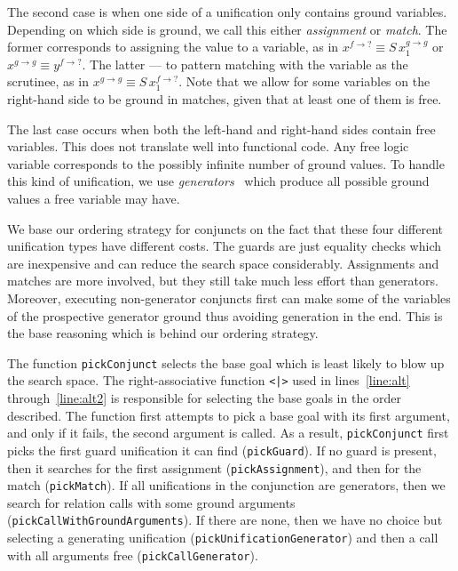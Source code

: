 The second case is when one side of a unification only contains ground variables.
Depending on which side is ground, we call this either \emph{assignment} or \emph{match}.
The former corresponds to assigning the value to a variable, as in $x^{f \rightarrow ?} \equiv S \, x_1^{g \rightarrow g}$ or $x^{g \rightarrow g} \equiv y^{f \rightarrow ?}$.
The latter --- to pattern matching with the variable as the scrutinee, as in $x^{g \rightarrow g} \equiv S \, x_1^{f \rightarrow ?}$.
Note that we allow for some variables on the right-hand side to be ground in matches, given that at least one of them is free.

The last case occurs when both the left-hand and right-hand sides contain free variables.
This does not translate well into functional code.
Any free logic variable corresponds to the possibly infinite number of ground values.
To handle this kind of unification, we use \emph{generators}~\cite{antoy2006overlapping} which produce all possible ground values a free variable may have.

We base our ordering strategy for conjuncts on the fact that these four different unification types have different costs.
The guards are just equality checks which are inexpensive and can reduce the search space considerably.
Assignments and matches are more involved, but they still take much less effort than generators.
Moreover, executing non-generator conjuncts first can make some of the variables of the prospective generator ground thus avoiding generation in the end.
This is the base reasoning which is behind our ordering strategy.

The function \lstinline{pickConjunct} selects the base goal which is least likely to blow up the search space.
The right-associative function \lstinline{<|>} used in lines~\ref{line:alt} through~\ref{line:alt2} is responsible for selecting the base goals in the order described.
The function first attempts to pick a base goal with its first argument, and only if it fails, the second argument is called.
As a result, \lstinline{pickConjunct} first picks the first guard unification it can find (\lstinline{pickGuard}).
If no guard is present, then it searches for the first assignment (\lstinline{pickAssignment}), and then for the match (\lstinline{pickMatch}).
If all unifications in the conjunction are generators, then we search for relation calls with some ground arguments (\lstinline{pickCallWithGroundArguments}).
If there are none, then we have no choice but selecting a generating unification (\lstinline{pickUnificationGenerator}) and then a call with all arguments free (\lstinline{pickCallGenerator}).

